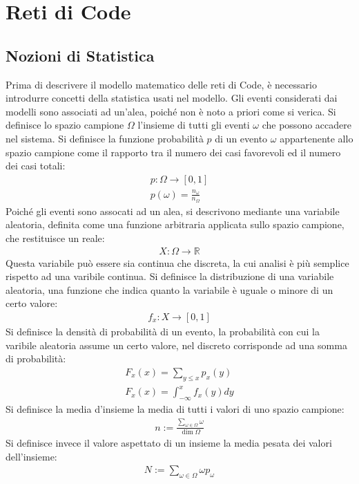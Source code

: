 \documentclass{article}
\numberwithin{equation}{subsection}
\begin{document}
\clearpage

\section{Reti di Code}

\subsection{Nozioni di Statistica}

Prima di descrivere il modello matematico delle reti di Code, è necessario introdurre concetti della statistica usati nel modello. Gli eventi considerati dai modelli sono 
associati ad un'alea, poiché non è noto a priori come si verica. Si definisce lo spazio campione $\Omega$ l'insieme di tutti gli eventi $\omega$ che possono accadere nel 
sistema. Si definisce la funzione probabilità $p$ di un evento $\omega$ appartenente allo spazio campione come il rapporto tra il numero dei casi favorevoli ed il numero dei casi 
totali:
\begin{gather*}
    p:\Omega\to[0,1]\\
    p(\omega)=\displaystyle\frac{n_{\omega}}{n_{\Omega}}
\end{gather*}
Poiché gli eventi sono assocati ad un alea, si descrivono mediante una variabile aleatoria, definita come una funzione arbitraria applicata sullo spazio campione, che 
restituisce un reale:
\begin{gather*}
    X:\Omega\to\mathbb{R}
\end{gather*}
Questa variabile può essere sia continua che discreta, la cui analisi è più semplice rispetto ad una varibile continua. 
Si definisce la distribuzione di una variabile aleatoria, una funzione che indica quanto la variabile è uguale o minore di un certo valore:
\begin{gather*}
    f_x:X\to[0,1]
\end{gather*}
Si definisce la densità di probabilità di un evento, la probabilità con cui la varibile aleatoria assume un certo valore, nel discreto corrisponde ad una somma di probabilità:
\begin{gather*}
    F_x(x)=\displaystyle\sum_{y\leq x}p_x(y)\\
    F_x(x)=\displaystyle\int_{-\infty}^xf_x(y)dy
\end{gather*}
Si definisce la media d'insieme la media di tutti i valori di uno spazio campione:
\begin{gather*}
    n:=\displaystyle\frac{\displaystyle\sum_{\omega\in\Omega}\omega}{\dim\Omega}
\end{gather*}
Si definisce invece il valore aspettato di un insieme la media pesata dei valori dell'insieme:
\begin{gather*}
    N:=\displaystyle\sum_{\omega\in\Omega}\omega p_\omega
\end{gather*}
\end{document}
